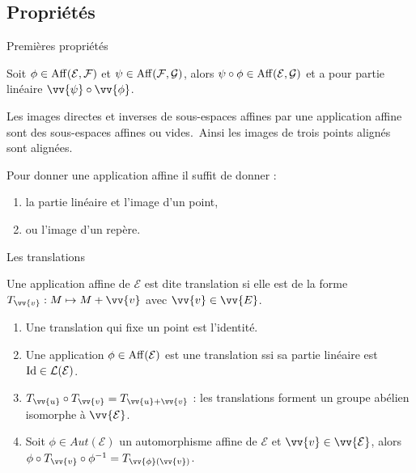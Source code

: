 \documentclass[
bigger]{m53beamer}
\begin{document}
\subsection{Propriétés}
  \begin{frame}{Premières propriétés}
    \begin{proposition}
      Soit $\phi\in\operatorname{Aff}(\mathcal{E},\mathcal{F})$ et $\psi\in\operatorname{Aff}(\mathcal{F},\mathcal{G})$, alors $\psi\circ\phi\in\operatorname{Aff}(\mathcal{E},\mathcal{G})$ et a pour partie linéaire $\vv{\psi}\circ\vv{\phi}$.
    \end{proposition}\pause
    \begin{proposition}
      Les images directes et inverses de sous-espaces affines par une application affine sont des sous-espaces affines ou vides.\pause\ Ainsi les images de trois points alignés sont alignées.
    \end{proposition}\pause
    \begin{proposition}
      Pour donner une application affine il suffit de donner :
      \begin{enumerate}[<+(1)->]
        \item la partie linéaire et l'image d'un point,
        \item ou l'image d'un repère.
      \end{enumerate}
    \end{proposition}
  \end{frame}
  \begin{frame}{Les translations}
    \begin{definition}
      Une application affine de $\mathcal{E}$ est dite \alert{translation} si elle est de la forme $T_{\vv{v}}:M \mapsto M+\vv{v}$ avec $\vv{v} \in \vv{E}$.
    \end{definition}
    \begin{enumerate}[<+(1)->]
      \item Une translation qui fixe un point est l'identité.
      \item Une application $\phi\in\operatorname{Aff}(\mathcal{E})$ est une translation ssi sa partie linéaire est $\mathrm{Id} \in \mathcal{L}(\mathcal{E})$.
      \item $T_{\vv{u}}\circ T_{\vv{v}} = T_{\vv{u}+\vv{v}}$ : les translations forment un groupe abélien isomorphe à $\vv{\mathcal{E}}$.
      \item Soit $\phi \in Aut(\mathcal{E})$ un automorphisme affine de $\mathcal{E}$ et $\vv{v} \in \vv{\mathcal{E}}$, alors $\phi\circ T_{\vv{v}}\circ\phi^{-1}=T_{\vv{\phi}(\vv{v})}$.
    \end{enumerate}
  \end{frame}
\end{document}
